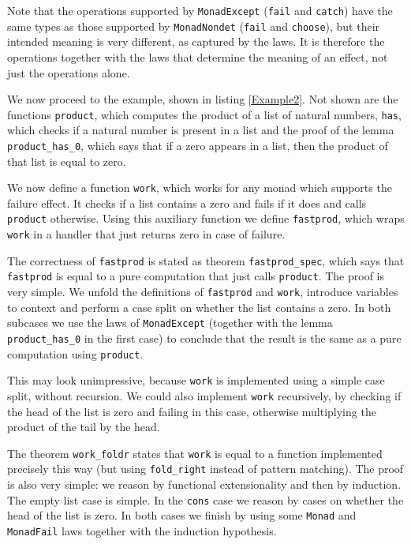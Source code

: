 \documentclass[declaration,inz,english,shortabstract]{iithesis}
\newcommand{\m}[1]{\texttt{#1}}
\begin{document}
Note that the operations supported by \m{MonadExcept} (\m{fail} and \m{catch}) have the same types as those supported by \m{MonadNondet} (\m{fail} and \m{choose}), but their intended meaning is very different, as captured by the laws. It is therefore the operations together with the laws that determine the meaning of an effect, not just the operations alone.


We now proceed to the example, shown in listing \ref{Example2}. Not shown are the functions \m{product}, which computes the product of a list of natural numbers, \m{has}, which checks if a natural number is present in a list and the proof of the lemma \m{product\_has\_0}, which says that if a zero appears in a list, then the product of that list is equal to zero.

We now define a function \m{work}, which works for any monad which supports the failure effect. It checks if a list contains a zero and fails if it does and calls \m{product} otherwise. Using this auxiliary function we define \m{fastprod}, which wraps \m{work} in a handler that just returns zero in case of failure.

The correctness of \m{fastprod} is stated as theorem \m{fastprod\_spec}, which says that \m{fastprod} is equal to a pure computation that just calls \m{product}. The proof is very simple. We unfold the definitions of \m{fastprod} and \m{work}, introduce variables to context and perform a case split on whether the list contains a zero. In both subcases we use the laws of \m{MonadExcept} (together with the lemma \m{product\_has\_0} in the first case) to conclude that the result is the same as a pure computation using \m{product}.

This may look unimpressive, because \m{work} is implemented using a simple case split, without recursion. We could also implement \m{work} recursively, by checking if the head of the list is zero and failing in this case, otherwise multiplying the product of the tail by the head.

The theorem \m{work\_foldr} states that \m{work} is equal to a function implemented precisely this way (but using \m{fold\_right} instead of pattern matching). The proof is also very simple: we reason by functional extensionality and then by induction. The empty list case is simple. In the \m{cons} case we reason by cases on whether the head of the list is zero. In both cases we finish by using some \m{Monad} and \m{MonadFail} laws together with the induction hypothesis.
\end{document}
